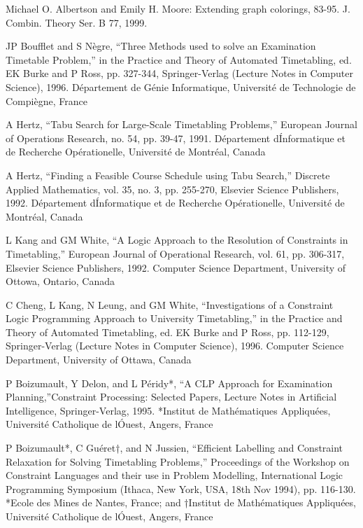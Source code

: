\begin{thebibliography}{99}
Michael O. Albertson and Emily H. Moore: Extending graph colorings, 83-95. J. Combin. Theory Ser. B 77, 1999.

JP Boufflet and S N\`egre, “Three Methods used to solve an Examination Timetable
Problem,” in the Practice and Theory of Automated Timetabling, ed. EK Burke and P
Ross, pp. 327-344, Springer-Verlag (Lecture Notes in Computer Science), 1996.
D\'epartement de G\'enie Informatique, Universit\'e de Technologie de Compi\`egne, France

A Hertz, “Tabu Search for Large-Scale Timetabling Problems,” European Journal of
Operations Research, no. 54, pp. 39-47, 1991. D\'epartement d\'Informatique et de
Recherche Op\'erationelle, Universit\'e de Montr\'eal, Canada

A Hertz, “Finding a Feasible Course Schedule using Tabu Search,” Discrete Applied
Mathematics, vol. 35, no. 3, pp. 255-270, Elsevier Science Publishers, 1992.
D\'epartement d\'Informatique et de Recherche Op\'erationelle, Universit\'e de
Montr\'eal, Canada

L Kang and GM White, “A Logic Approach to the Resolution of Constraints in
Timetabling,” European Journal of Operational Research, vol. 61, pp. 306-317, Elsevier
Science Publishers, 1992. Computer Science Department, University of Ottowa,
Ontario, Canada

C Cheng, L Kang, N Leung, and GM White, “Investigations of a Constraint Logic Programming Approach to University Timetabling,” in the Practice and Theory of
Automated Timetabling, ed. EK Burke and P Ross, pp. 112-129, Springer-Verlag (Lecture
Notes in Computer Science), 1996. Computer Science Department, University
of Ottawa, Canada

P Boizumault, Y Delon, and L P\'eridy*, ``A CLP Approach for Examination Planning,''Constraint Processing: Selected Papers, Lecture Notes in Artificial Intelligence,
Springer-Verlag, 1995. *Institut de Math\'ematiques Appliqu\'ees, Universit\'e Catholique
de l\'Ouest, Angers, France

P Boizumault*, C Gu\'eret†, and N Jussien, “Efficient Labelling and Constraint Relaxation for Solving Timetabling Problems,” Proceedings of the Workshop on Constraint
Languages and their use in Problem Modelling, International Logic Programming Symposium
(Ithaca, New York, USA, 18th Nov 1994), pp. 116-130. *Ecole des Mines de
Nantes, France; and †Institut de Math\'ematiques Appliqu\'ees, Universit\'e Catholique
de l\'Ouest, Angers, France


\end{thebibliography}
